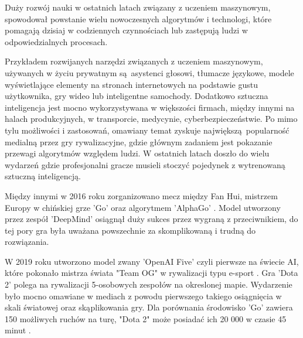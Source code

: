 \documentclass[12pt,oneside,a4paper]{report}
\begin{document}
Duży rozwój nauki w ostatnich latach związany z uczeniem maszynowym, spowodował powstanie wielu
nowoczesnych algorytmów i technologi, które pomagają dzisiaj w codziennych czynnościach lub 
zastępują ludzi w odpowiedzialnych procesach. 

Przykładem rozwijanych narzędzi związanych z uczeniem maszynowym, używanych w życiu
prywatnym są asystenci głosowi, tłumacze językowe, modele wyświetlające elementy na
stronach internetowych na podstawie gustu użytkownika, gry wideo lub inteligentne samochody.
Dodatkowo sztuczna inteligencja jest mocno wykorzystywana w większości firmach, między 
innymi na halach produkcyjnych, w transporcie, medycynie, cyberbezpieczeństwie. 
Po mimo tylu możliwości i zastosowań, omawiany temat zyskuje największą popularność
medialną przez gry rywalizacyjne, gdzie głównym zadaniem jest pokazanie przewagi algorytmów względem
ludzi. W ostatnich latach doszło do wielu wydarzeń gdzie profesjonalni gracze 
musieli stoczyć pojedynek z wytrenowaną sztuczną inteligencją. 


Między innymi w 2016 roku zorganizowano
mecz między Fan Hui, mistrzem Europy w chińskiej grze 'Go' oraz algorytmem 'AlphaGo' \cite{Go}.
Model utworzony przez zespół 'DeepMind' osiągnął duży sukces przez wygraną z przeciwnikiem,
do tej pory gra była uważana powszechnie za skomplikowaną i trudną do rozwiązania.

W 2019 roku utworzono model zwany 'OpenAI Five' czyli pierwsze na świecie AI, które pokonało
mistrza świata "Team OG" w rywalizacji typu e-sport \cite{Dota2}. Gra 'Dota 2' polega na rywalizacji 5-osobowych
zespołów na okreslonej mapie.
Wydarzenie było mocno omawiane w mediach z powodu pierwszego takiego osiągnięcia w skali światowej
oraz skąplikowania gry. 
Dla porównania środowisko 'Go' zawiera 150 możliwych ruchów na turę, "Dota 2"
może posiadać ich 20 000 w czasie 45 minut \cite{Dota2}.
\end{document}
